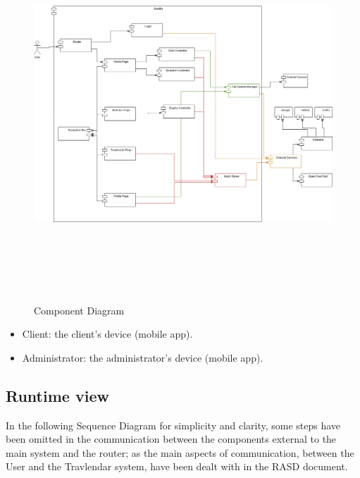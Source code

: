 \documentclass [12pt]{article}
\begin{document}
\null
{}
\begin{figure}[ht!]
\centering
\includegraphics[height=14cm, width=\linewidth]{ComponentViewDiagram.png}
\caption{Component Diagram}
\end{figure}  
\clearpage


\begin{itemize}[•]
\item Client:  the client’s device (mobile app).
\item Administrator: the administrator’s device (mobile app).
\end{itemize}
\clearpage

\subsection{Runtime view}
In the following Sequence Diagram for simplicity and clarity, some steps have been omitted in the communication between the components external to the main system and the router; as the main aspects of communication, between the User and the Travlendar system, have been dealt with in the RASD document.

\null
{}
\end{document}
